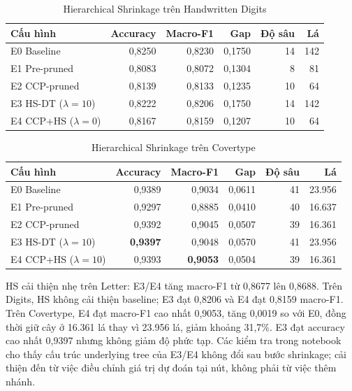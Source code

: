 \begin{table}[H]
    \centering
    \caption{Hierarchical Shrinkage trên Handwritten Digits}
    \label{tab:hs-digits}
    \small
    \begin{tabular}{@{}lrrrrr@{}}
        \toprule
        \textbf{Cấu hình} & \textbf{Accuracy} & \textbf{Macro-F1} & \textbf{Gap} & \textbf{Độ sâu} & \textbf{Lá} \\
        \midrule
        E0 Baseline & 0,8250 & 0,8230 & 0,1750 & 14 & 142 \\
        E1 Pre-pruned & 0,8083 & 0,8072 & 0,1304 & 8 & 81 \\
        E2 CCP-pruned & 0,8139 & 0,8133 & 0,1235 & 10 & 64 \\
        E3 HS-DT ($\lambda=10$) & 0,8222 & 0,8206 & 0,1750 & 14 & 142 \\
        E4 CCP+HS ($\lambda=0$) & 0,8167 & 0,8159 & 0,1207 & 10 & 64 \\
        \bottomrule
    \end{tabular}
\end{table}

\begin{table}[H]
    \centering
    \caption{Hierarchical Shrinkage trên Covertype}
    \label{tab:hs-covertype}
    \small
    \begin{tabular}{@{}lrrrrr@{}}
        \toprule
        \textbf{Cấu hình} & \textbf{Accuracy} & \textbf{Macro-F1} & \textbf{Gap} & \textbf{Độ sâu} & \textbf{Lá} \\
        \midrule
        E0 Baseline & 0,9389 & 0,9034 & 0,0611 & 41 & 23.956 \\
        E1 Pre-pruned & 0,9297 & 0,8885 & 0,0410 & 40 & 16.637 \\
        E2 CCP-pruned & 0,9392 & 0,9045 & 0,0507 & 39 & 16.361 \\
        E3 HS-DT ($\lambda=10$) & \textbf{0,9397} & 0,9048 & 0,0570 & 41 & 23.956 \\
        E4 CCP+HS ($\lambda=10$) & 0,9393 & \textbf{0,9053} & 0,0504 & 39 & 16.361 \\
        \bottomrule
    \end{tabular}
\end{table}

HS cải thiện nhẹ trên Letter: E3/E4 tăng macro-F1 từ 0,8677 lên 0,8688. Trên Digits,
HS không cải thiện baseline; E3 đạt 0,8206 và E4 đạt 0,8159 macro-F1. Trên Covertype,
E4 đạt macro-F1 cao nhất 0,9053, tăng 0,0019 so với E0, đồng thời giữ cây ở 16.361 lá
thay vì 23.956 lá, giảm khoảng 31,7\%. E3 đạt accuracy cao nhất 0,9397 nhưng không giảm
độ phức tạp. Các kiểm tra trong notebook cho thấy cấu trúc underlying tree của E3/E4
không đổi sau bước shrinkage; cải thiện đến từ việc điều chỉnh giá trị dự đoán tại nút,
không phải từ việc thêm nhánh.

